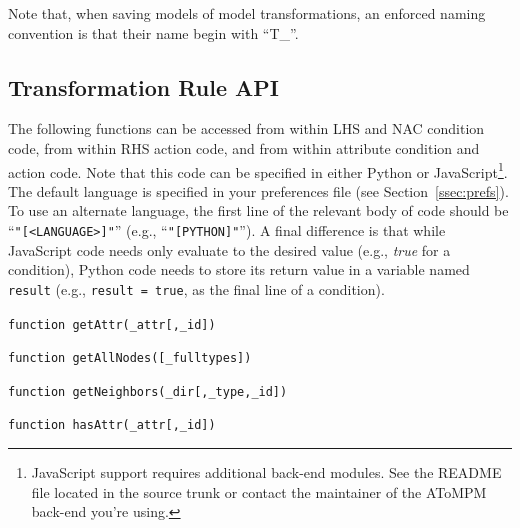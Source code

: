 \documentclass{article}
\numberwithin{equation}{section}
\numberwithin{figure}{section}
\begin{document}
Note that, when saving models of model transformations, an enforced naming convention is that their name begin with ``T\_''.



\subsection{Transformation Rule API}
\label{ssec:trapi}
The following functions can be accessed from within LHS and NAC condition code, from within RHS action code, and from within attribute condition and action code. Note that this code can be specified in either Python or JavaScript\footnote{JavaScript support requires additional back-end modules. See the README file located in the source trunk or contact the maintainer of the AToMPM back-end you're using.}. The default language is specified in your preferences file (see Section~\ref{ssec:prefs}). To use an alternate language, the first line of the relevant body of code should be ``\texttt{"[<LANGUAGE>]"}'' (e.g., ``\texttt{"[PYTHON]"}''). A final difference is that while JavaScript code needs only evaluate to the desired value (e.g., \textit{true} for a condition), Python code needs to store its return value in a variable named \texttt{result} (e.g., \texttt{result = true}, as the final line of a condition).\\

\begin{center}	{\large \texttt{function getAttr(\_attr[,\_id])}} \end{center}


\begin{center}	{\large \texttt{function getAllNodes([\_fulltypes])}} \end{center}


\begin{center}	{\large \texttt{function getNeighbors(\_dir[,\_type,\_id])}} \end{center}


\begin{center}	{\large \texttt{function hasAttr(\_attr[,\_id])}} \end{center}
\end{document}
